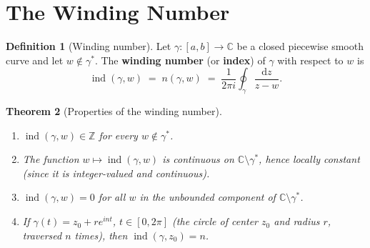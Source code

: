 \documentclass[12pt,a4paper,openany]{book}
\theoremstyle{definition}
\newtheorem{definition}{Definition}[chapter]
\theoremstyle{plain}
\newtheorem{theorem}[definition]{Theorem}
\theoremstyle{remark}
\newcommand{\C}{\mathbb{C}}
\newcommand{\Z}{\mathbb{Z}}
\DeclareMathOperator{\ind}{ind}
\newcommand{\dd}{\mathrm{d}}
\begin{document}
\section{The Winding Number}
\label{sec:winding-number}

\begin{definition}[Winding number]\label{def:winding-number}
Let $\gamma\colon[a,b]\to\C$ be a closed piecewise smooth curve and let
$w\notin\gamma^*$.  The \textbf{winding number}
(or \textbf{index}) of $\gamma$ with respect to $w$ is
\[
  \ind(\gamma,w) \;=\; n(\gamma,w) \;=\;
  \frac{1}{2\pi i}\oint_\gamma\frac{\dd z}{z-w}.
\]
\end{definition}

\begin{theorem}[Properties of the winding number]\label{thm:winding-number-properties}
\leavevmode
\begin{enumerate}[label=\textup{(\roman*)}]
  \item $\ind(\gamma,w)\in\Z$ for every $w\notin\gamma^*$.
  \item The function $w\mapsto\ind(\gamma,w)$ is continuous on
    $\C\setminus\gamma^*$, hence locally constant (since it is integer-valued
    and continuous).
  \item $\ind(\gamma,w) = 0$ for all $w$ in the unbounded component of
    $\C\setminus\gamma^*$.
  \item If $\gamma(t) = z_0+re^{int}$, $t\in[0,2\pi]$ (the circle of center
    $z_0$ and radius $r$, traversed $n$ times), then
    $\ind(\gamma,z_0) = n$.
\end{enumerate}
\end{theorem}
\end{document}

